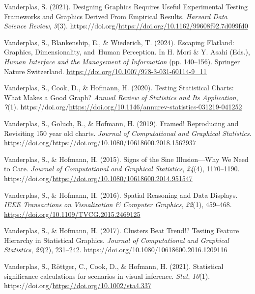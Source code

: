 \documentclass[
  10pt,
  letterpaper,
  DIV=11,
  numbers=noendperiod]{scrartcl}
\newlength{\cslhangindent}
\newenvironment{CSLReferences}[2] %
 {\begin{list}{}{%
  \setlength{\itemindent}{0pt}
  \setlength{\leftmargin}{0pt}
  \setlength{\parsep}{0pt}
  \ifodd #1
   \setlength{\leftmargin}{\cslhangindent}
   \setlength{\itemindent}{-1\cslhangindent}
  \fi
  \setlength{\itemsep}{#2\baselineskip}}}
 {\end{list}}
\begin{document}
\begin{CSLReferences}{1}{0}
Vanderplas, S. (2021). Designing {Graphics} {Requires} {Useful}
{Experimental} {Testing} {Frameworks} and {Graphics} {Derived} {From}
{Empirical} {Results}. \emph{Harvard Data Science Review}, \emph{3}(3).
https://doi.org/\url{https://doi.org/10.1162/99608f92.7d099fd0}

Vanderplas, S., Blankenship, E., \& Wiederich, T. (2024). Escaping
{Flatland}: {Graphics}, {Dimensionality}, and~{Human Perception}. In H.
Mori \& Y. Asahi (Eds.), \emph{Human {Interface} and the {Management} of
{Information}} (pp. 140--156). Springer Nature Switzerland.
\url{https://doi.org/10.1007/978-3-031-60114-9_11}

Vanderplas, S., Cook, D., \& Hofmann, H. (2020). Testing {Statistical}
{Charts}: {What} {Makes} a {Good} {Graph}? \emph{Annual Review of
Statistics and Its Application}, \emph{7}(1).
https://doi.org/\url{https://doi.org/10.1146/annurev-statistics-031219-041252}

Vanderplas, S., Goluch, R., \& Hofmann, H. (2019). Framed! {Reproducing}
and {Revisiting} 150 year old charts. \emph{Journal of Computational and
Graphical Statistics}.
https://doi.org/\url{https://doi.org/10.1080/10618600.2018.1562937}

Vanderplas, S., \& Hofmann, H. (2015). Signs of the {Sine}
{Illusion}---{Why} {We} {Need} to {Care}. \emph{Journal of Computational
and Graphical Statistics}, \emph{24}(4), 1170--1190.
https://doi.org/\url{https://doi.org/10.1080/10618600.2014.951547}

Vanderplas, S., \& Hofmann, H. (2016). Spatial {Reasoning} and {Data
Displays}. \emph{IEEE Transactions on Visualization \& Computer
Graphics}, \emph{22}(1), 459--468.
\url{https://doi.org/10.1109/TVCG.2015.2469125}

Vanderplas, S., \& Hofmann, H. (2017). Clusters {Beat} {Trend}!?
{Testing} {Feature} {Hierarchy} in {Statistical} {Graphics}.
\emph{Journal of Computational and Graphical Statistics}, \emph{26}(2),
231--242. \url{https://doi.org/10.1080/10618600.2016.1209116}

Vanderplas, S., Röttger, C., Cook, D., \& Hofmann, H. (2021).
Statistical significance calculations for scenarios in visual inference.
\emph{Stat}, \emph{10}(1).
https://doi.org/\url{https://doi.org/10.1002/sta4.337}


\end{CSLReferences}
\end{document}
